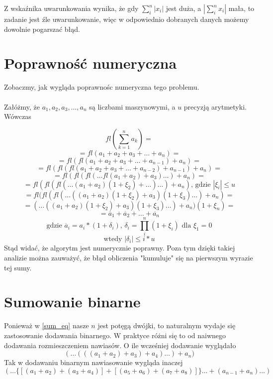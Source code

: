 \documentclass[11pt, wide]{article}
\begin{document}
    Z wskaźnika uwarunkowania wynika, że gdy $\sum_i^{n}|x_i|$ jest duża, a $|\sum_i^{n}x_i|$ mała, to zadanie jest źle
    uwarunkowanie, więc w odpowiednio dobranych danych możemy dowolnie pogarszać błąd. 
    \section{Poprawność numeryczna}\label{N:Poprawnosc}
    Zobaczmy, jak wygląda poprawnośc numeryczna tego problemu.
    \\\\
    Załóżmy, że $a_1, a_2, a_3, \ldots, a_n$ są liczbami maszynowymi, a $u$ precyzją arytmetyki. Wówczas
    
$$
        fl(\sum_{k=1}^{n}a_k) = 
$$
$$
        = fl(a_1 + a_2 + a_3 + \ldots + a_n) =
$$
$$
        = fl(fl(a_1 + a_2 + a_3 + \ldots + a_{n-1}) + a_n) =
$$    
$$
        = fl(fl(fl(a_1 + a_2 + a_3 + \ldots + a_{n-2})+a_{n-1}) + a_n) =
$$
$$
        = fl(fl(fl( \ldots fl(a_1 + a_2) + a_3) \ldots ) + a_n) =
$$
$$
        = fl(fl(fl(\ldots (a_1 + a_2)(1 + \xi_2) + \ldots)\ldots)+a_n) \text{, gdzie } |\xi_i| \leq u 
$$
$$
        = fl(fl(fl(\ldots ((a_1 + a_2)(1 + \xi_2) + a_3)(1 + \xi_3)\ldots) + a_n) = 
$$
$$
        = (\ldots((a_1 + a_2)(1 + \xi_2) + a_3)(1 + \xi_3)\ldots) + a_n)(1 + \xi_{n}) = 
$$
$$
        = \ddot{a_1} + \ddot{a_2} + \ldots + \ddot{a_n} 
$$
$$
        \text{gdzie } \ddot{a_i} = a_i * (1 + \delta_i) \text{, } \delta_i = \prod_{i}^{n}(1 + \xi_i) \text{ dla } \xi_1 = 0
$$
$$
        \text{wtedy } |\delta_i| \leq i*u
$$
    Stąd widać, że algorytm jest numerycznie poprawny. Poza tym dzięki takiej analizie
    można zauważyć, że błąd obliczenia "kumuluje" się na pierwszym wyrazie tej sumy.
    \section{Sumowanie binarne}
    Ponieważ w \eqref{sum_eq} nasze $n$ jest potęgą dwójki, to naturalnym wydaje się zastosowanie
    dodawania binarnego. W praktyce różni się to od naiwnego dodawania rozmieszczeniem nawiasów. O ile wcześniej dodawanie wyglądało
$$
    ( \ldots (((a_1 + a_2) + a_3) + a_4) \ldots ) + a_n)
$$
    Tak w dodawaniu binarnym nawiasowanie wygląda inaczej
$$
    (\ldots\{[(a_1 + a_2) + (a_3 + a_4)] + [(a_5 + a_6) + (a_7 + a_8)]\} \ldots +(a_{n-1} + a_n)\ldots)
$$
\end{document}

